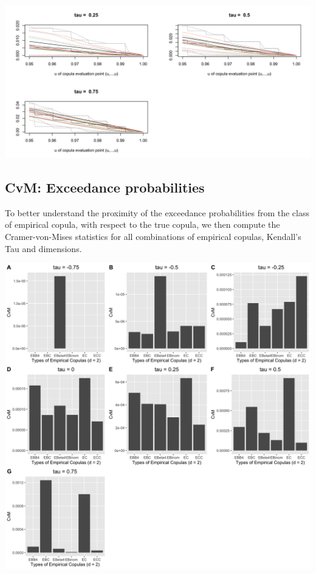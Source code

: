 \documentclass[12pt]{report}
\newcommand{\1}{\mathbf{1}}
\begin{document}
\begin{flushleft}
\begin{center}
\label{G_5d_s}
\includegraphics[width=17cm]{ExceedanceProb/G_5d_s.png}
\end{center}%

\newpage
\subsection{CvM: Exceedance probabilities}
To better understand the proximity of the exceedance probabilities from the class of empirical copula, with respect to the true copula, we then compute the Cramer-von-Mises statistics for all combinations of empirical copulas, Kendall's Tau and dimensions.

\begin{center}
\label{t4_2d_s_CvM}
\includegraphics[width=17cm]{ExceedanceCvM/t4_2d_s_CvM.png}
\end{center}%


\end{flushleft}
\end{document}
